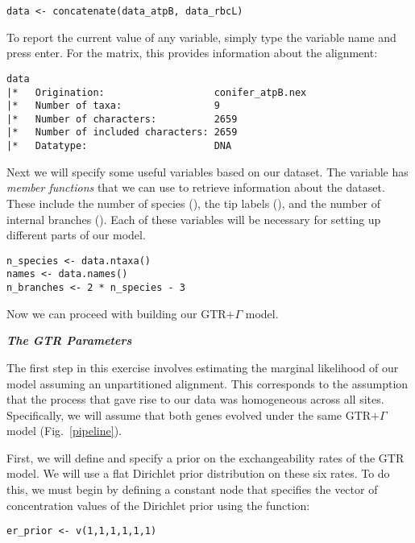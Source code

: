 {\tt \begin{snugshade*}
\begin{lstlisting}
data <- concatenate(data_atpB, data_rbcL)
\end{lstlisting}
\end{snugshade*}}

To report the current value of any variable, simply type the variable name and press enter. For the  matrix, this provides information about the alignment:


{\tt \begin{snugshade*}
\begin{lstlisting}
data
|*   Origination:                   conifer_atpB.nex
|*   Number of taxa:                9
|*   Number of characters:          2659
|*   Number of included characters: 2659
|*   Datatype:                      DNA
\end{lstlisting}
\end{snugshade*}}


Next we will specify some useful variables based on our dataset. The variable  has \textit{member functions} that we can use to retrieve information about the dataset. 
These include the number of species (), the tip labels (), and the number of internal branches ().
Each of these variables will be necessary for setting up different parts of our model.
{\tt \begin{snugshade*}
\begin{lstlisting}
n_species <- data.ntaxa()
names <- data.names()	
n_branches <- 2 * n_species - 3 
\end{lstlisting}
\end{snugshade*}}

Now we can proceed with building our GTR$+\Gamma$ model.

\textbf{\textit{The GTR Parameters}}

The first step in this exercise involves estimating the marginal likelihood of our model assuming an unpartitioned alignment. 
This corresponds to the assumption that the process that gave rise to our data was homogeneous across all sites. 
Specifically, we will assume that both genes evolved under the same GTR$+\Gamma$ model (Fig.~\ref{pipeline}). 

First, we will define and specify a prior on the exchangeability rates of the GTR model. We will use a flat Dirichlet prior distribution on these six rates. To do this, we must begin by defining a constant node that specifies the vector of concentration values of the Dirichlet prior using the  function:
{\tt \begin{snugshade*}
\begin{lstlisting}
er_prior <- v(1,1,1,1,1,1) 
\end{lstlisting}
\end{snugshade*}}


